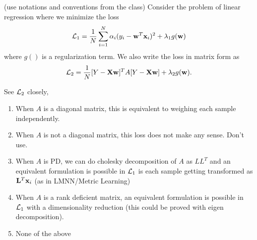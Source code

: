 \begin{frame}
\section{}
  (use notations  and conventions from the class) Consider the problem of linear regression where we minimize the loss
  \[{\cal L}_1 = \frac{1}{N}\sum_{i=1}^N \alpha_i (y_i - {\bf w}^T{\bf x}_i)^2 + \lambda_1 g({\bf w})\] where $g()$ is a regularization term. We also write the loss in matrix form as
  \[ {\cal L}_2 = \frac{1}{N} [Y-{\bf X}{\bf w}]^TA[Y-{\bf X}{\bf w}] + \lambda_2 g({\bf w}). \]


  See ${\cal L}_2$ closely,
     \begin{enumerate}[label=(\Alph*)]
       \item When $A$ is a diagonal matrix, this is equivalent to weighing each sample independently.   %
      \item When $A$ is not a  diagonal matrix, this loss does not make any sense. Don't use.
      \item When $A$ is PD, we can do cholesky decomposition of $A$ as $LL^T$ and an equivalent formulation is possible in ${\cal L}_1$ is each sample getting transformed as ${\bf L}^T{\bf x}_i$ (as in LMNN/Metric Learning)   %
      \item When $A$ is a rank deficient matrix, an equivalent formulation is possible in ${\cal L}_1$ with a dimensionality reduction (this could be proved with eigen decomposition).   %
      \item None of the above   %
     \end{enumerate}
\end{frame}
